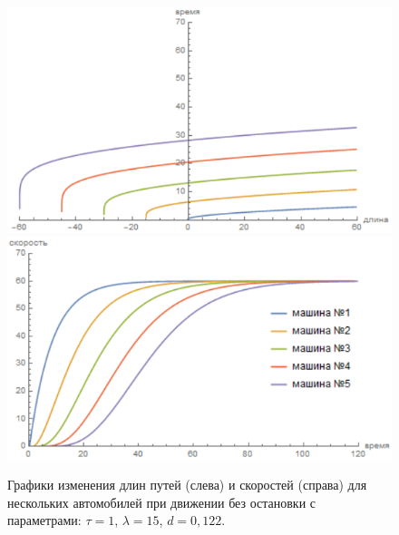 \documentclass[12pt, a4paper]{extarticle}
\numberwithin{equation}{section}
\begin{document}
\begin{figure}[h!]
	\begin{center}
		\begin{minipage}[h!]{0.48\linewidth}
			\includegraphics[width=1\linewidth,height=0.2\textheight]
			{Images/distance_without_stop_d=0,122_tau=1.png}
		\end{minipage}
		\hfill 
		\begin{minipage}[h!]{0.48\linewidth}
			\includegraphics[width=1\linewidth,height=0.2\textheight]
			{Images/speed_without_stop_d=0,122_tau=1.png}
		\end{minipage}
		\label{without_stop_d=0,122_tau=1}
		\caption{Графики изменения длин путей (слева) и скоростей (справа) для нескольких автомобилей при движении без остановки с параметрами: $\tau=1$, $\lambda=15$, $d=0,122$.}
	\end{center}
\end{figure}
\end{document}
